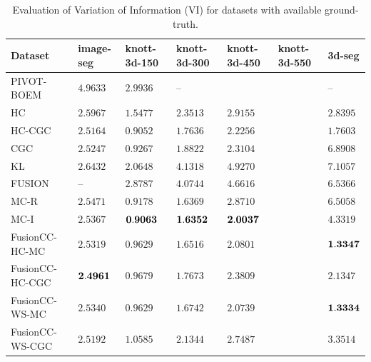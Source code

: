 \documentclass[10pt,twocolumn,letterpaper]{article}
\theoremstyle{definition}
\begin{document}
\begin{table}[t]
   \tiny
   \centering
   \caption{Evaluation of Variation of Information (VI) for datasets with available ground-truth.}
   \label{tab:eval}
   \begin{tabular}{lllllll}
      \toprule
         Dataset          &  image-seg   & knott-3d-150 & knott-3d-300   & knott-3d-450 & knott-3d-550 &3d-seg\\
      \midrule 
         PIVOT-BOEM       &   $ 4.9633$  &    $ 2.9936$ &       --       &              &              &  --\\ 
         HC               &   $ 2.5967$  &    $ 1.5477$ &    $ 2.3513$   &    $ 2.9155$ &              & $       2.8395$\\
         HC-CGC           &   $ 2.5164$  &    $ 0.9052$ &    $ 1.7636$   &    $ 2.2256$ &              & $       1.7603$ \\
         CGC              &   $ 2.5247$  &    $ 0.9267$ &    $ 1.8822$   &    $ 2.3104$ &              & $       6.8908$ \\
         KL               &   $ 2.6432$  &    $ 2.0648$ &    $ 4.1318$   &    $ 4.9270$ &              & $       7.1057$\\
         FUSION           &      --      &    $ 2.8787$ &    $ 4.0744$   &    $ 4.6616$ &              & $       6.5366$ \\
         MC-R             &   $ 2.5471$  &    $ 0.9178$ &    $ 1.6369$   &    $ 2.8710$ &              & $       6.5058$\\   
         MC-I             &   $ 2.5367$  & $\bf 0.9063$ & $\bf 1.6352$   & $\bf 2.0037$ &              & $       4.3319$\\  
         FusionCC-HC-MC   &   $ 2.5319$  &    $ 0.9629$ &    $ 1.6516$   &    $ 2.0801$ &              & $\bf    1.3347$ \\  
         FusionCC-HC-CGC  &$\bf 2.4961$  &    $ 0.9679$ &    $ 1.7673$   &    $ 2.3809$ &              & $       2.1347$ \\  
         FusionCC-WS-MC   &   $ 2.5340$  &    $ 0.9629$ &    $ 1.6742$   &    $ 2.0739$ &              & $\bf    1.3334$ \\  
         FusionCC-WS-CGC  &   $ 2.5192$  &    $ 1.0585$ &    $ 2.1344$   &    $ 2.7487$ &              & $       3.3514$ \\      
      \bottomrule
   \end{tabular}
\end{table}
\end{document}
